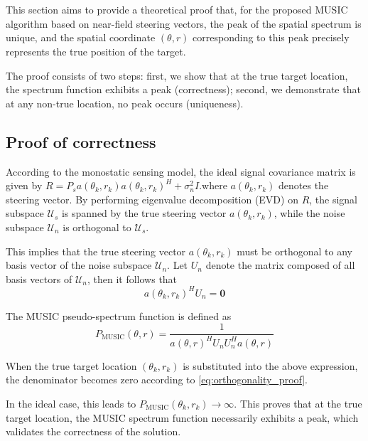 \documentclass[lettersize,journal]{IEEEtran}
\begin{document}
{\appendices

\section{}
\label{appendix:music}
This section aims to provide a theoretical proof that, for the proposed MUSIC algorithm based on near-field steering vectors, the peak of the spatial spectrum is unique, and the spatial coordinate $(\theta, r)$ corresponding to this peak precisely represents the true position of the target.

The proof consists of two steps: first, we show that at the true target location, the spectrum function exhibits a peak (correctness); second, we demonstrate that at any non-true location, no peak occurs (uniqueness).

\subsection{Proof of  correctness}

According to the monostatic sensing model, the ideal signal covariance matrix is given by $R = P_s a(\theta_k, r_k) a(\theta_k, r_k)^H + \sigma^2_n I$.where $a(\theta_k, r_k)$ denotes the steering vector. By performing eigenvalue decomposition (EVD) on $R$, the signal subspace $\mathcal{U}_s$ is spanned by the true steering vector $a(\theta_k, r_k)$, while the noise subspace $\mathcal{U}_n$ is orthogonal to $\mathcal{U}_s$.

This implies that the true steering vector $a(\theta_k, r_k)$ must be orthogonal to any basis vector of the noise subspace $\mathcal{U}_n$. Let $U_n$ denote the matrix composed of all basis vectors of $\mathcal{U}_n$, then it follows that
\begin{equation}
	a(\theta_k, r_k)^H U_n = \mathbf{0}
	\label{eq:orthogonality_proof}
\end{equation}

The MUSIC pseudo-spectrum function is defined as
\begin{equation}
	P_{\text{MUSIC}}(\theta, r) = \frac{1}{a(\theta, r)^H U_n U_n^H a(\theta, r)}
	\label{eq:music_spectrum_proof_app}
\end{equation}

When the true target location $(\theta_k, r_k)$ is substituted into the above expression, the denominator becomes zero according to \eqref{eq:orthogonality_proof}.

In the ideal case, this leads to $P_{\text{MUSIC}}(\theta_k, r_k) \to \infty$. This proves that at the true target location, the MUSIC spectrum function necessarily exhibits a peak, which validates the correctness of the solution.

}
\end{document}
